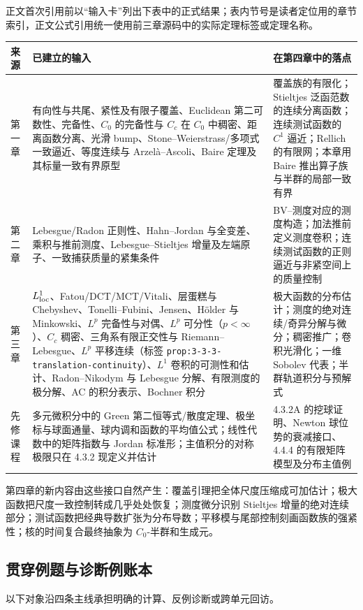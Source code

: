 \documentclass[11pt,a4paper]{ctexart}
\begin{document}
正文首次引用前以“输入卡”列出下表中的正式结果；表内节号是读者定位用的章节索引，正文公式引用统一使用前三章源码中的实际定理标签或定理名称。

\begin{longtable}{p{}p{}p{}}
\toprule
来源 & 已建立的输入 & 在第四章中的落点\\
\midrule
第一章 & 有向性与共尾、紧性及有限子覆盖、Euclidean 第二可数性、完备性、$C_0$ 的完备性与 $C_c$ 在 $C_0$ 中稠密、距离函数分离、光滑 bump、Stone--Weierstrass/多项式一致逼近、等度连续与 Arzel\`a--Ascoli、Baire 定理及其标量一致有界原型 & 覆盖族的有限化；Stieltjes 泛函范数的连续分离函数；连续测试函数的 $C^1$ 逼近；Rellich 的有限网；本章用 Baire 推出算子族与半群的局部一致有界\\
第二章 & Lebesgue/Radon 正则性、Hahn--Jordan 与全变差、乘积与推前测度、Lebesgue--Stieltjes 增量及左端原子、一致捕获质量的紧集条件 & BV--测度对应的测度构造；加法推前定义测度卷积；连续测试函数的正则逼近与非紧空间上的质量控制\\
第三章 & $L^1_{\rm loc}$、Fatou/DCT/MCT/Vitali、层蛋糕与 Chebyshev、Tonelli--Fubini、Jensen、H\"older 与 Minkowski、$L^p$ 完备性与对偶、$L^p$ 可分性（$p<\infty$）、$C_c$ 稠密、三角系有限正交性与 Riemann--Lebesgue、$L^p$ 平移连续（标签 \texttt{prop:3-3-3-translation-continuity}）、$L^1$ 卷积的可测性和估计、Radon--Nikodym 与 Lebesgue 分解、有限测度的极分解、AC 的积分表示、Bochner 积分 & 极大函数的分布估计；测度的绝对连续/奇异分解与微分；稠密推广；卷积光滑化；一维 Sobolev 代表；半群轨道积分与预解式\\
先修课程 & 多元微积分中的 Green 第二恒等式/散度定理、极坐标与球面通量、球内调和函数的平均值公式；线性代数中的矩阵指数与 Jordan 标准形；主值积分的对称极限只在 4.3.2 现定义并估计 & 4.3.2A 的挖球证明、Newton 球位势的衰减接口、4.4.4 的有限矩阵模型及分布主值例\\
\bottomrule
\end{longtable}

第四章的新内容由这些接口自然产生：覆盖引理把全体尺度压缩成可加估计；极大函数把尺度一致控制转成几乎处处恢复；测度微分识别 Stieltjes 增量的绝对连续部分；测试函数把经典导数扩张为分布导数；平移模与尾部控制刻画函数族的强紧性；核的时间复合最终抽象为 $C_0$-半群和生成元。

\subsection{贯穿例题与诊断例账本}

以下对象沿四条主线承担明确的计算、反例诊断或跨单元回访。
\end{document}
